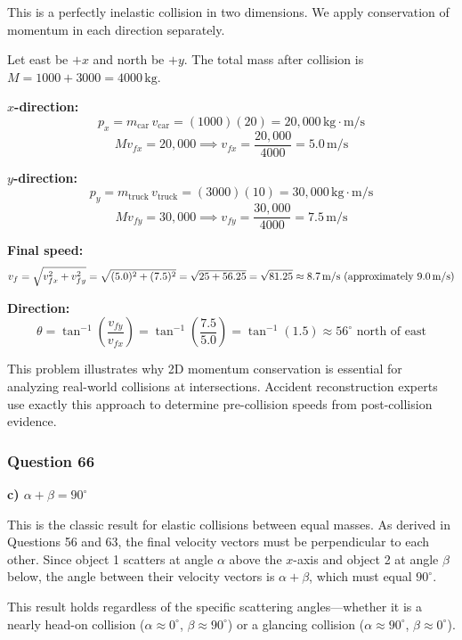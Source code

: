 \documentclass[12pt,letterpaper]{article}
\begin{document}
\begin{explanationbox}
This is a perfectly inelastic collision in two dimensions. We apply conservation of momentum in each direction separately.

Let east be $+x$ and north be $+y$. The total mass after collision is $M = 1000 + 3000 = 4000\,\text{kg}$.

\textbf{$x$-direction:}
\[
p_x = m_{\text{car}}\,v_{\text{car}} = (1000)(20) = 20{,}000\,\text{kg}\cdot\text{m/s}
\]
\[
Mv_{fx} = 20{,}000 \implies v_{fx} = \frac{20{,}000}{4000} = 5.0\,\text{m/s}
\]

\textbf{$y$-direction:}
\[
p_y = m_{\text{truck}}\,v_{\text{truck}} = (3000)(10) = 30{,}000\,\text{kg}\cdot\text{m/s}
\]
\[
Mv_{fy} = 30{,}000 \implies v_{fy} = \frac{30{,}000}{4000} = 7.5\,\text{m/s}
\]

\textbf{Final speed:}
\[
v_f = \sqrt{v_{fx}^2 + v_{fy}^2} = \sqrt{(5.0)^2 + (7.5)^2} = \sqrt{25 + 56.25} = \sqrt{81.25} \approx 8.7\,\text{m/s} \text{ (approximately 9.0\,m/s)}
\]

\textbf{Direction:}
\[
\theta = \tan^{-1}\!\left(\frac{v_{fy}}{v_{fx}}\right) = \tan^{-1}\!\left(\frac{7.5}{5.0}\right) = \tan^{-1}(1.5) \approx 56^\circ \text{ north of east}
\]

This problem illustrates why 2D momentum conservation is essential for analyzing real-world collisions at intersections. Accident reconstruction experts use exactly this approach to determine pre-collision speeds from post-collision evidence.
\end{explanationbox}

\subsubsection*{Question 66}

\begin{answerbox}
\textbf{c) $\alpha + \beta = 90^\circ$}
\end{answerbox}

\begin{explanationbox}
This is the classic result for elastic collisions between equal masses. As derived in Questions 56 and 63, the final velocity vectors must be perpendicular to each other. Since object 1 scatters at angle $\alpha$ above the $x$-axis and object 2 at angle $\beta$ below, the angle between their velocity vectors is $\alpha + \beta$, which must equal $90^\circ$.

This result holds regardless of the specific scattering angles---whether it is a nearly head-on collision ($\alpha \approx 0^\circ$, $\beta \approx 90^\circ$) or a glancing collision ($\alpha \approx 90^\circ$, $\beta \approx 0^\circ$).
\end{explanationbox}
\end{document}
